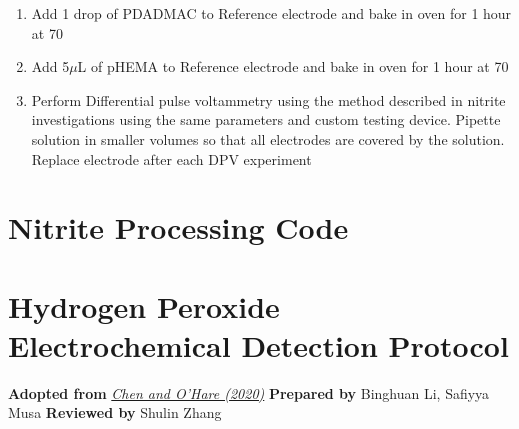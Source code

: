 \begin{appendices}
\begin{enumerate}
    \item Add 1 drop of PDADMAC to Reference electrode and bake in oven for 1 hour at 70
    \item Add 5$\mu$L of pHEMA to Reference electrode and bake in oven for 1 hour at 70
    \item Perform Differential pulse voltammetry using the method described in nitrite investigations using the same parameters and custom testing device. Pipette solution in smaller volumes so that all electrodes are covered by the solution. Replace electrode after each DPV experiment
\end{enumerate}

\newpage
\section{Nitrite Processing Code} \label{app:nitrite_code}




\newpage
\section{Hydrogen Peroxide Electrochemical Detection Protocol} \label{app:h2o2_protocol}
\textbf{Adopted from} \href{https://pubs.rsc.org/en/content/articlelanding/2020/an/c9an02438g}{\textit{Chen and O'Hare (2020)}} \quad \textbf{Prepared by} Binghuan Li, Safiyya Musa \quad  \textbf{Reviewed by} Shulin Zhang

\end{appendices}
